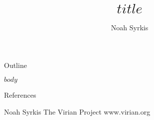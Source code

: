 \documentclass[aspectratio=32]{beamer}
\title{$title$}
\author{Noah Syrkis}
\date{\mydate{\today}}
\begin{document}
\begin{frame}
  \titlepage
\end{frame}

\begin{frame}{Outline}
   \tableofcontents    %
\end{frame}

$body$

\begin{frame}[allowframebreaks]{References}
  \begingroup
  \linespread{1.2}
  \scriptsize
  \printbibliography
  \endgroup
\end{frame}

\begin{frame}
  \begin{center}
    \vfill
    \large Noah Syrkis
    \vfill
    \large The Virian Project
    \vfill
    \large www.virian.org
    \vfill
  \end{center}
\end{frame}
\end{document}
